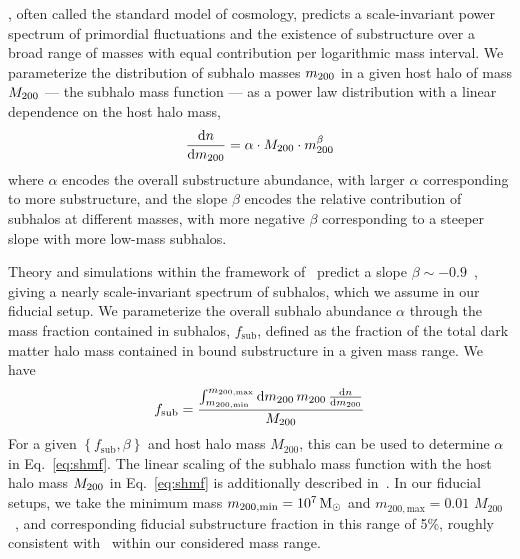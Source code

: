 \documentclass[twocolumn]{aastex62}
\begin{document}
 \lcdm, often called the standard model of cosmology, predicts a scale-invariant power spectrum of primordial fluctuations and the existence of substructure over a broad range of masses with equal contribution per logarithmic mass interval. We parameterize the distribution of subhalo masses $m_{200}$ in a given host halo of mass $M_{200}$ --- the subhalo mass function --- as a power law distribution with a linear dependence on the host halo mass,
\begin{equation}
\frac{\diff n}{\diff \mtwo} = \alpha \cdot M_\mathrm{200}\cdot\mtwo^{\beta}
\label{eq:shmf}
\end{equation}
where $\alpha$ encodes the overall substructure abundance, with larger $\alpha$ corresponding to more substructure, and the slope $\beta$ encodes the relative contribution of subhalos at different masses, with more negative $\beta$ corresponding to a steeper slope with more low-mass subhalos. %

Theory and simulations within the framework of \lcdm~predict a slope $\beta\sim-0.9$~\citep{0809.0898,0802.2265}, giving a nearly scale-invariant spectrum of subhalos, which we assume in our fiducial setup.
We parameterize the overall subhalo abundance $\alpha$ through the mass fraction contained in subhalos, $f_\mathrm{sub}$, defined as the fraction of the total dark matter halo mass contained in bound substructure in a given mass range. We have
\begin{equation}
f_\mathrm{sub} = \frac{\int_{m_\mathrm{200, min}}^{m_\mathrm{200, max}}\diff \mtwo\,\mtwo\,\frac{\diff n}{\diff \mtwo}}{M_\mathrm{200}}
\end{equation}
For a given $\left\{f_\mathrm{sub},\beta\right\}$ and host halo mass $M_\mathrm{200}$, this can be used to determine $\alpha$ in Eq.~\ref{eq:shmf}. The linear scaling of the subhalo mass function with the host halo mass $M_{200}$ in Eq.~\ref{eq:shmf} is additionally described in~\citet{2016MNRAS.457.1208H,2017MNRAS.469.1997D}. In our fiducial setups, we take the minimum mass $m_\mathrm{200, min} = 10^7\,\textrm{M}_\odot$ and $m_\mathrm{200, max} = 0.01\,\,M_\mathrm{200}$~\citep{2017MNRAS.469.1997D,2018PhRvD..97l3002H}, and corresponding fiducial substructure fraction in this range of 5\%, roughly consistent with~\citet{2018PhRvD..97l3002H,2019arXiv190504182H,2002ApJ...572...25D} within our considered mass range.
\end{document}
